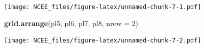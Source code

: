 \documentclass[]{article}
\newenvironment{Shaded}{\begin{snugshade}}{\end{snugshade}}
\newcommand{\KeywordTok}[1]{\textcolor[rgb]{0.13,0.29,0.53}{\textbf{#1}}}
\newcommand{\DataTypeTok}[1]{\textcolor[rgb]{0.13,0.29,0.53}{#1}}
\newcommand{\DecValTok}[1]{\textcolor[rgb]{0.00,0.00,0.81}{#1}}
\newcommand{\CommentTok}[1]{\textcolor[rgb]{0.56,0.35,0.01}{\textit{#1}}}
\newcommand{\NormalTok}[1]{#1}
\begin{document}
\begin{Shaded}
\begin{Highlighting}[]
{{{{{{{{\CommentTok{# =====Display===== #}

\KeywordTok{grid.arrange}\NormalTok{(pl1, pl2, pl3, pl4, }\DataTypeTok{nrow =} \DecValTok{2}\NormalTok{)}
\end{Highlighting}
\end{Shaded}

\texttt{[image: NCEE\_files/figure-latex/unnamed-chunk-7-1.pdf]}

\begin{Shaded}
\begin{Highlighting}[]
\KeywordTok{grid.arrange}\NormalTok{(pl5, pl6, pl7, pl8, }\DataTypeTok{nrow =} \DecValTok{2}\NormalTok{)}
\end{Highlighting}
\end{Shaded}

\texttt{[image: NCEE\_files/figure-latex/unnamed-chunk-7-2.pdf]}
\end{document}
